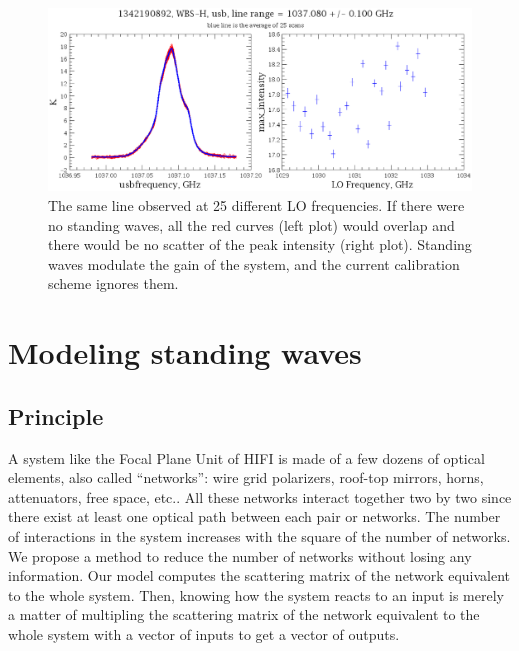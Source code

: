 \documentclass[a4paper,11pt]{article}
\begin{document}
\begin{figure}[hbtp]
    \centering
    \includegraphics[width=\textwidth]{1342190892_4a_line_frequency_1037-080GHz_level_usb_20_WBS-H_max_intensity}
    \caption{\label{fig:scatter_real_data}The same line observed at 25 different LO frequencies.  If there were no standing waves, all the red curves (left plot) would overlap and there would be no scatter of the peak intensity (right plot).  Standing waves modulate the gain of the system, and the current calibration scheme ignores them.}
\end{figure}






\section{Modeling standing waves}




\subsection{Principle}
A system like the Focal Plane Unit of HIFI is made of a few dozens of optical elements, also called ``networks'': wire grid polarizers, roof-top mirrors, horns, attenuators, free space, etc..
All these networks interact together two by two since there exist at least one optical path between each pair or networks.
The number of interactions in the system increases with the square of the number of networks.
We propose a method to reduce the number of networks without losing any information.
Our model computes the scattering matrix of the network equivalent to the whole system.
Then, knowing how the system reacts to an input is merely a matter of multipling the scattering matrix of the network equivalent to the whole system with a vector of inputs to get a vector of outputs.
\end{document}
